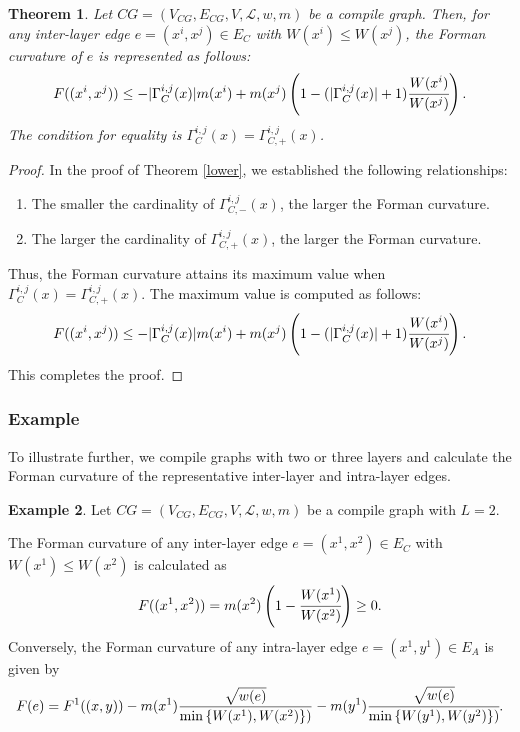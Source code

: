\documentclass[preprint,12pt,number]{elsarticle}
\theoremstyle{plain} %
\newtheorem{theorem}{\indent\sc Theorem}[section] %
\theoremstyle{definition} %
\newtheorem{example}[theorem]{\indent\sc Example}
\begin{document}
\begin{theorem}
\label{upper}
    Let $CG = (V_{CG}, E_{CG}, V, \mathcal{L}, w, m)$ be a compile graph. 
    Then, for any inter-layer edge $e =(x^i, x^j) \in E_C$ with $W(x^i) \leq W(x^j)$, the Forman curvature of $e$ is represented as follows:
    \begin{eqnarray*}
        F((x^i,x^j)) \leq -|\Gamma^{i,j}_C(x)|m(x^i) + m(x^j)\left(1 - (|\Gamma_C^{i,j}(x)|+1)\cfrac{W(x^i)}{W(x^j)}\right).
    \end{eqnarray*}
    The condition for equality is $\Gamma^{i,j}_C (x)= \Gamma^{i,j}_{C,+}(x)$.
\end{theorem}

\begin{proof}
    In the proof of Theorem \ref{lower}, we established the following relationships:
    \begin{enumerate}
        \item The smaller the cardinality of $\Gamma_{C,-}^{i,j}(x)$, the larger the Forman curvature.
        \item The larger the cardinality of $\Gamma_{C,+}^{i,j}(x)$, the larger the Forman curvature.
    \end{enumerate}
    Thus, the Forman curvature attains its maximum value when $\Gamma^{i,j}_C (x)= \Gamma^{i,j}_{C,+}(x)$. The maximum value is computed as follows:
    \begin{eqnarray*}
        F((x^i,x^j)) \leq -|\Gamma^{i,j}_C(x)|m(x^i) + m(x^j)\left(1 - (|\Gamma_C^{i,j}(x)|+1)\cfrac{W(x^i)}{W(x^j)}\right).
    \end{eqnarray*}
    This completes the proof.
\end{proof}

\subsubsection{Example}
To illustrate further, we compile graphs with two or three layers and calculate the Forman curvature of the representative inter-layer and intra-layer edges.
\begin{example}
    Let $CG = (V_{CG}, E_{CG}, V, \mathcal{L}, w, m)$ be a compile graph with $L=2$. 
\end{example}
The Forman curvature of any inter-layer edge $e =(x^1, x^2) \in E_C$ with $W(x^1) \leq W(x^2)$ is calculated as
    \begin{eqnarray*}
        F((x^1,x^2))= m(x^2)\left(1 - \cfrac{W(x^1)}{W(x^2)}\right) \geq 0.
    \end{eqnarray*}
Conversely, the Forman curvature of any intra-layer edge $e = (x^1, y^1) \in E_A$ is given by
    \begin{eqnarray*}
        F(e) = F^1((x,y)) - m(x^1)\frac{\sqrt{w(e)}}{\min \left\{W(x^1), W(x^2) \right\})} - m(y^1)\cfrac{\sqrt{w(e)}}{\min \left\{W(y^1), W(y^2) \right\})}.
    \end{eqnarray*}
\end{document}
